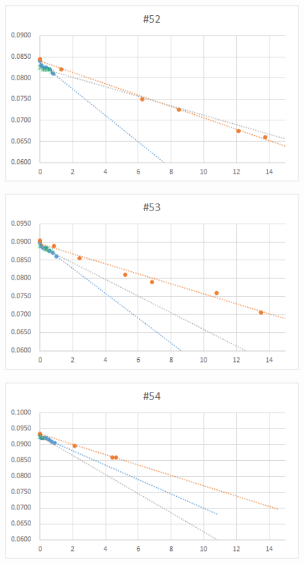 \documentclass[12pt,a4paper]{jarticle}
\begin{document}
\begin{figure}[htbp]
  \centering
     \includegraphics[width=120mm]{vol_052.png}
\end{figure}
\begin{figure}[htbp]
  \centering
     \includegraphics[width=120mm]{vol_053.png}
\end{figure}
\begin{figure}[htbp]
  \centering
     \includegraphics[width=120mm]{vol_054.png}
\end{figure}
\end{document}
